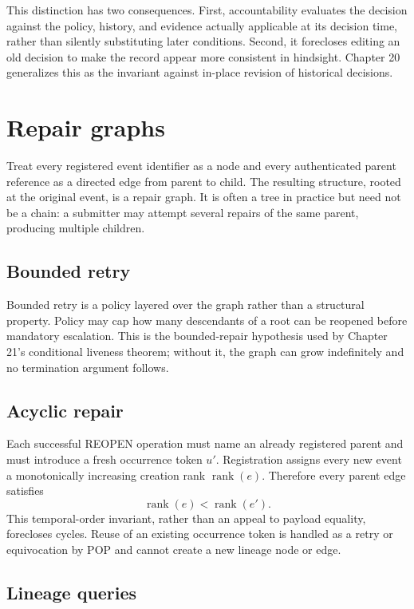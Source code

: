 \documentclass[11pt,openany]{book}
\begin{document}
This distinction has two consequences. First, accountability evaluates the
decision against the policy, history, and evidence actually applicable at its
decision time, rather than silently substituting later conditions. Second, it
forecloses editing an old decision to make the record appear more consistent
in hindsight. Chapter 20 generalizes this as the invariant against in-place
revision of historical decisions.

\section{Repair graphs}

Treat every registered event identifier as a node and every authenticated
parent reference as a directed edge from parent to child. The resulting
structure, rooted at the original event, is a repair graph. It is often a tree
in practice but need not be a chain: a submitter may attempt several repairs of
the same parent, producing multiple children.

\subsection{Bounded retry}

Bounded retry is a policy layered over the graph rather than a structural
property. Policy may cap how many descendants of a root can be reopened before
mandatory escalation. This is the bounded-repair hypothesis used by Chapter
21's conditional liveness theorem; without it, the graph can grow indefinitely
and no termination argument follows.

\subsection{Acyclic repair}

Each successful REOPEN operation must name an already registered parent and
must introduce a fresh occurrence token \(u'\). Registration assigns every
new event a monotonically increasing creation rank
\(\operatorname{rank}(e)\). Therefore every parent edge satisfies
\[
 \operatorname{rank}(e)<\operatorname{rank}(e').
\]
This temporal-order invariant, rather than an appeal to payload equality,
forecloses cycles. Reuse of an existing occurrence token is handled as a retry
or equivocation by POP and cannot create a new lineage node or edge.

\subsection{Lineage queries}
\end{document}
